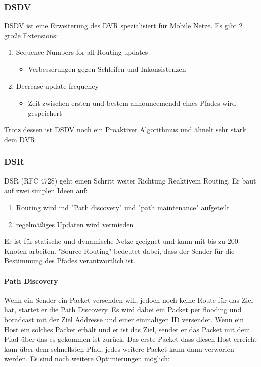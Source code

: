 		\subsubsection{DSDV}
			DSDV ist eine Erweiterung des DVR spezialisiert für Mobile Netze. Es gibt 2 große Extensions: 
			\begin{enumerate}
				\item Sequence Numbers for all Routing updates
				\begin{itemize}
					\item Verbesserungen gegen Schleifen und Inkonsistenzen
				\end{itemize}
				\item Decrease update frequency
				\begin{itemize}
					\item Zeit zwischen ersten und bestem announcemendd eines Pfades wird gespeichert
				\end{itemize}
			\end{enumerate}
			Trotz dessen ist DSDV noch ein Proaktiver Algorithmus und ähnelt sehr stark dem DVR. 

		\subsubsection{DSR}
			DSR (RFC 4728) geht einen Schritt weiter Richtung Reaktivem Routing. Er baut auf zwei simplen Ideen auf: 
			\begin{enumerate}
				\item Routing wird ind "Path discovery" und "path maintenance" aufgeteilt
				\item regelmäßiges Updaten wird vermieden
			\end{enumerate}
			Er ist für statische und dynamische Netze geeignet und kann mit bis zu 200 Knoten arbeiten. "Source Routing" bedeutet dabei, dass der Sender für die Bestimmung des Pfades verantwortlich ist.
			\paragraph{Path Discovery}
				Wenn ein Sender ein Packet versenden will, jedoch noch keine Route für das Ziel hat, startet er die Path Discovery. Es wird dabei ein Packet per flooding und boradcast mit der Ziel Addresse und einer einmaligen ID versendet. Wenn ein Host ein solches Packet erhält und er ist das Ziel, sendet er das Packet mit dem Pfad über das es gekommen ist zurück. Das erste Packet dass diesen Host erreicht kam über dem schnellsten Pfad, jedes weitere Packet kann dann verworfen werden. 
				Es sind noch weitere Optimierungen möglich: 
